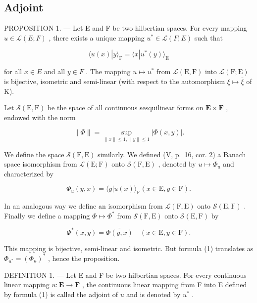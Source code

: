\subsection{Adjoint}

PROPOSITION 1. --- Let E and F be two hilbertian spaces. For every mapping \(u \in \mathcal{L}(E; F)\) , there exists a unique mapping \(u^{*} \in \mathcal{L}(F; E)\) such that

\[
\langle u (x) | y \rangle_ {\mathrm{F}} = \langle x | u ^ {*} (y) \rangle_ {\mathrm{E}}\tag{1}
\]

for all \(x \in E\) and all \(y \in F\) . The mapping \(u \mapsto u^{*}\) from \(\mathcal{L}(\mathrm{E}, \mathrm{F})\) into \(\mathcal{L}(\mathrm{F}; \mathrm{E})\) is bijective, isometric and semi-linear (with respect to the automorphism \(\xi \mapsto \bar{\xi}\) of K).

Let \(\mathcal{S}(\mathrm{E},\mathrm{F})\) be the space of all continuous sesquilinear forms on \(\mathbf{E}\times \mathbf{F}\) , endowed with the norm

\[
\| \Phi \| = \sup _ {\| x \| \leqslant 1, \| y \| \leqslant 1} | \Phi (x, y) |.\tag{2}
\]

We define the space \(\mathcal{S}(\mathrm{F},\mathrm{E})\) similarly. We defined (V, p.~16, cor. 2) a Banach space isomorphism from \(\mathcal{L}(\mathrm{E};\mathrm{F})\) onto \(\mathcal{S}(\mathrm{F},\mathrm{E})\) , denoted by \(u\mapsto\Phi_{u}\) and characterized by

\[
\Phi_ {u} (y, x) = \langle y | u (x) \rangle_ {\mathrm{F}} (x \in \mathrm{E}, y \in \mathrm{F}).\tag{3}
\]

In an analogous way we define an isomorphism from \(\mathcal{L}(\mathrm{F},\mathrm{E})\) onto \(\mathcal{S}(\mathrm{E},\mathrm{F})\) . Finally we define a mapping \(\Phi \mapsto \Phi^{*}\) from \(\mathcal{S}(\mathrm{F},\mathrm{E})\) onto \(\mathcal{S}(\mathrm{E},\mathrm{F})\) by

\[
\Phi^ {*} (x, y) = \overline {{\Phi (y , x)}} \quad (x \in \mathrm{E}, y \in \mathrm{F}).\tag{4}
\]

This mapping is bijective, semi-linear and isometric. But formula (1) translates as \(\Phi_{u^{*}} = (\Phi_{u})^{*}\) , hence the proposition.

DEFINITION 1. --- Let E and F be two hilbertian spaces. For every continuous linear mapping \(u: \mathbf{E} \to \mathbf{F}\) , the continuous linear mapping from F into E defined by formula (1) is called the adjoint of \(u\) and is denoted by \(u^*\) .

